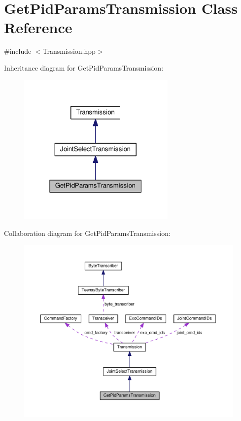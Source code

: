\hypertarget{classGetPidParamsTransmission}{}\section{Get\+Pid\+Params\+Transmission Class Reference}
\label{classGetPidParamsTransmission}


{\ttfamily \#include $<$Transmission.\+hpp$>$}



Inheritance diagram for Get\+Pid\+Params\+Transmission\+:\nopagebreak
\begin{figure}[H]
\begin{center}
\leavevmode
\includegraphics[width=219pt]{classGetPidParamsTransmission__inherit__graph}
\end{center}
\end{figure}


Collaboration diagram for Get\+Pid\+Params\+Transmission\+:
\nopagebreak
\begin{figure}[H]
\begin{center}
\leavevmode
\includegraphics[width=350pt]{classGetPidParamsTransmission__coll__graph}
\end{center}
\end{figure}
